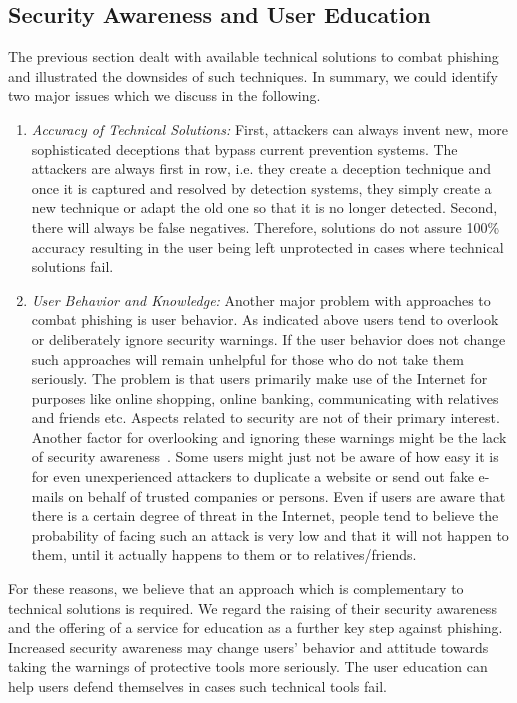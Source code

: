  \subsection{Security Awareness and User Education}
 \label{s:awareness}

The previous section dealt with available technical solutions to combat phishing and illustrated the downsides of such techniques.
In summary, we could identify two major issues which we discuss in the following.
\begin{enumerate}
	\item\textit{Accuracy of Technical Solutions:} First, attackers can always invent new, more sophisticated deceptions that bypass current prevention systems.
	 The attackers are always first in row, i.e. they create a deception technique and once it is captured and resolved by detection systems, they simply create a new technique or adapt the old one so that it is no longer detected.
	 Second, there will always be false negatives.
	 Therefore, solutions do not assure 100\% accuracy resulting in the user being left unprotected in cases where technical solutions fail.
	\item\textit{User Behavior and Knowledge:} Another major problem with approaches to combat phishing is user behavior.
 As indicated above users tend to overlook or deliberately ignore security warnings.
 If the user behavior does not change such approaches will remain unhelpful for those who do not take them seriously.
 The problem is that users primarily make use of the Internet for purposes like online shopping, online banking, communicating with relatives and friends etc.
 Aspects related to security are not of their primary interest.
 Another factor for overlooking and ignoring these warnings might be the lack of security awareness~\cite{akhawe2013alice}.
 Some users might just not be aware of how easy it is for even unexperienced attackers to duplicate a website or send out fake e-mails on behalf of trusted companies or persons.
 Even if users are aware that there is a certain degree of threat in the Internet, people tend to believe the probability of facing such an attack is very low and that it will not happen to them, until it actually happens to them or to relatives/friends.
\end{enumerate}

For these reasons, we believe that an approach which is complementary to technical solutions is required.
We regard the raising of their security awareness and the offering of a service for education as a further key step against phishing.
Increased security awareness may change users' behavior and attitude towards taking the warnings of protective tools more seriously.
The user education can help users defend themselves in cases such technical tools fail.

